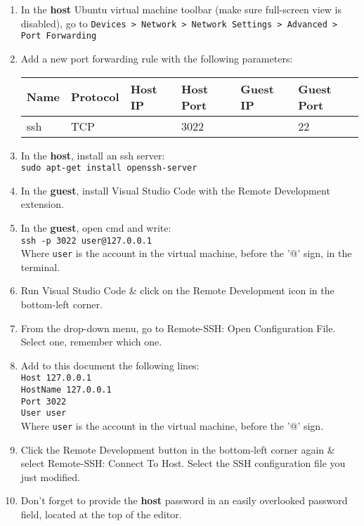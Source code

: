 \documentclass[10pt]{article}
\begin{document}
\begin{enumerate}
    \item In the \textbf{host} Ubuntu virtual machine toolbar (make sure full-screen view is disabled), go to \texttt{Devices > Network > Network Settings > Advanced > Port Forwarding}
    \item Add a new port forwarding rule with the following parameters: \\
    \begin{tabular}{|l|l|l|l|l|l|}
        \hline
        Name & Protocol & Host IP & Host Port & Guest IP & Guest Port \\ \hline
        ssh & TCP & & 3022 & & 22 \\ \hline 
    \end{tabular}
    \item In the \textbf{host}, install an ssh server: \\
    \texttt{sudo apt-get install openssh-server}
    \item In the \textbf{guest}, install Visual Studio Code with the Remote Development extension.
    \item In the \textbf{guest}, open cmd and write: \\
    \texttt{ssh -p 3022 user@127.0.0.1} \\
    Where \texttt{user} is the account in the virtual machine, before the '@' sign, in the terminal.
    \item Run Visual Studio Code \& click on the Remote Development icon in the bottom-left corner.
    \item From the drop-down menu, go to Remote-SSH: Open Configuration File. Select one, remember which one.
    \item Add to this document the following lines: \\
    \texttt{Host 127.0.0.1} \\
    \texttt{HostName 127.0.0.1} \\
    \texttt{Port 3022} \\
    \texttt{User user} \\
    Where \texttt{user} is the account in the virtual machine, before the '@' sign.
    \item Click the Remote Development button in the bottom-left corner again \& select Remote-SSH: Connect To Host. Select the SSH configuration file you just modified.
    \item Don't forget to provide the \textbf{host} password in an easily overlooked password field, located at the top of the editor.
\end{enumerate}
\end{document}
